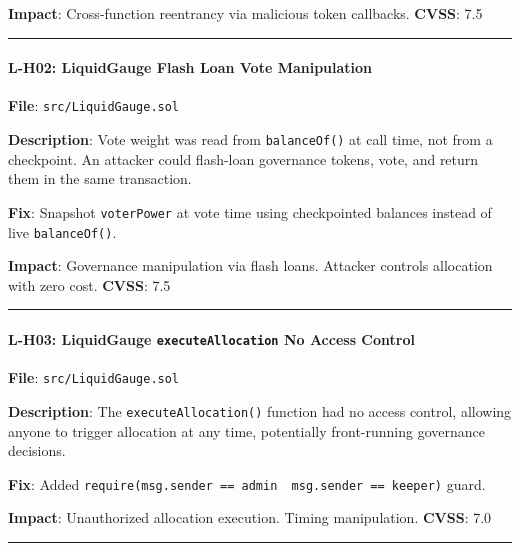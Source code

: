 \documentclass[
]{article}
\begin{document}
\textbf{Impact}: Cross-function reentrancy via malicious token
callbacks. \textbf{CVSS}: 7.5

\begin{center}\rule{0.5\linewidth}{0.5pt}\end{center}

\paragraph{L-H02: LiquidGauge Flash Loan Vote
Manipulation}\label{l-h02-liquidgauge-flash-loan-vote-manipulation}

\textbf{File}: \texttt{src/LiquidGauge.sol}

\textbf{Description}: Vote weight was read from \texttt{balanceOf()} at
call time, not from a checkpoint. An attacker could flash-loan
governance tokens, vote, and return them in the same transaction.

\textbf{Fix}: Snapshot \texttt{voterPower} at vote time using
checkpointed balances instead of live \texttt{balanceOf()}.

\textbf{Impact}: Governance manipulation via flash loans. Attacker
controls allocation with zero cost. \textbf{CVSS}: 7.5

\begin{center}\rule{0.5\linewidth}{0.5pt}\end{center}

\paragraph{\texorpdfstring{L-H03: LiquidGauge \texttt{executeAllocation}
No Access
Control}{L-H03: LiquidGauge executeAllocation No Access Control}}\label{l-h03-liquidgauge-executeallocation-no-access-control}

\textbf{File}: \texttt{src/LiquidGauge.sol}

\textbf{Description}: The \texttt{executeAllocation()} function had no
access control, allowing anyone to trigger allocation at any time,
potentially front-running governance decisions.

\textbf{Fix}: Added
\texttt{require(msg.sender\ ==\ admin\ \textbar{}\textbar{}\ msg.sender\ ==\ keeper)}
guard.

\textbf{Impact}: Unauthorized allocation execution. Timing manipulation.
\textbf{CVSS}: 7.0

\begin{center}\rule{0.5\linewidth}{0.5pt}\end{center}
\end{document}
